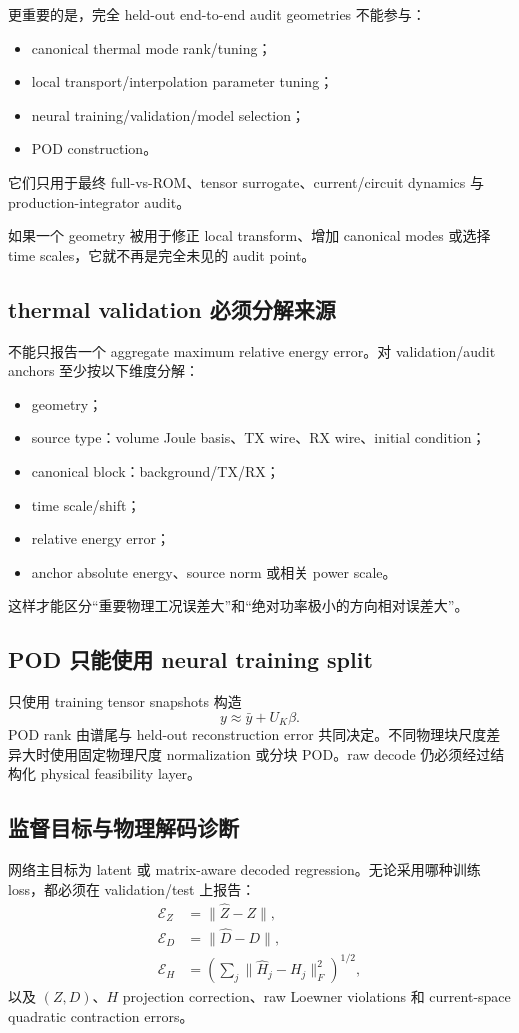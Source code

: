 更重要的是，完全 held-out end-to-end audit geometries 不能参与：
\begin{itemize}
  \item canonical thermal mode rank/tuning；
  \item local transport/interpolation parameter tuning；
  \item neural training/validation/model selection；
  \item POD construction。
\end{itemize}
它们只用于最终 full-vs-ROM、tensor surrogate、current/circuit dynamics 与 production-integrator audit。

如果一个 geometry 被用于修正 local transform、增加 canonical modes 或选择 time scales，它就不再是完全未见的 audit point。

\subsection{thermal validation 必须分解来源}
不能只报告一个 aggregate maximum relative energy error。对 validation/audit anchors 至少按以下维度分解：
\begin{itemize}
  \item geometry；
  \item source type：volume Joule basis、TX wire、RX wire、initial condition；
  \item canonical block：background/TX/RX；
  \item time scale/shift；
  \item relative energy error；
  \item anchor absolute energy、source norm 或相关 power scale。
\end{itemize}
这样才能区分“重要物理工况误差大”和“绝对功率极小的方向相对误差大”。

\subsection{POD 只能使用 neural training split}
只使用 training tensor snapshots 构造
\begin{equation}
y\approx\bar y+U_K\beta.
\end{equation}
POD rank 由谱尾与 held-out reconstruction error 共同决定。不同物理块尺度差异大时使用固定物理尺度 normalization 或分块 POD。raw decode 仍必须经过结构化 physical feasibility layer。

\subsection{监督目标与物理解码诊断}
网络主目标为 latent 或 matrix-aware decoded regression。无论采用哪种训练 loss，都必须在 validation/test 上报告：
\begin{align}
\mathcal E_Z&=\|\widehat Z-Z\|,\\
\mathcal E_D&=\|\widehat D-D\|,\\
\mathcal E_H&=\left(\sum_j\|\widehat H_j-H_j\|_F^2\right)^{1/2},
\end{align}
以及 $(Z,D)$、$H$ projection correction、raw Loewner violations 和 current-space quadratic contraction errors。

